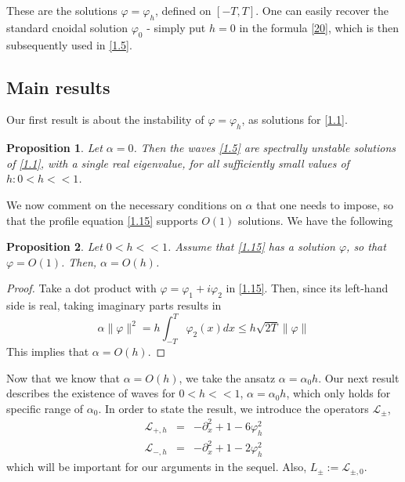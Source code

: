 \documentclass[12pt]{amsart}
\newtheorem{proposition}{Proposition}
\theoremstyle{definition}
\theoremstyle{remark}
\numberwithin{equation}{section}
\renewcommand{\(}{\left(}
\renewcommand{\)}{\right)}
\renewcommand{\[}{\left[}
\renewcommand{\]}{\right]}
\newcommand{\cl}{{\mathcal L}}
\newcommand{\al}{\alpha}
\newcommand{\vp}{\varphi}
\begin{document}
  These are the solutions $\vp=\vp_h$, defined on $[-T,T]$. One can easily recover the standard cnoidal solution $\vp_0$ -  simply put  $h=0$ in the formula \eqref{20}, which is then subsequently used in \eqref{1.5}.
  \subsection{Main results}
  Our first result is about the instability of $\vp=\vp_h$, as solutions for \eqref{1.1}.
  \begin{proposition}
  	\label{prop:10}
  	Let $\al=0$. Then the waves \eqref{1.5} are spectrally unstable solutions of \eqref{1.1}, with a single real eigenvalue,  for all sufficiently small values of $h: 0<h<<1$.
  \end{proposition}
  We now comment on the necessary conditions on $\al$ that   one needs to impose, so that the profile equation \eqref{1.15} supports $O(1)$ solutions. We have the following
  \begin{proposition}
  	\label{prop:90}
  	Let $0<h<<1$. Assume that \eqref{1.15} has a solution $\vp$, so that $\vp=O(1)$. Then, $\al=O(h)$.
  \end{proposition}
  \begin{proof}
  Take a dot product with $\vp=\vp_1+i \vp_2$ in \eqref{1.15}. Then, since its left-hand side is real, taking imaginary parts results in
  $$
  \al \|\vp\|^2 = h \int_{-T}^T  \vp_2(x) dx\leq h \sqrt{2 T} \|\vp\|
  $$
  This implies that $\al=O(h)$.
  \end{proof}

  Now that we know that $\al=O(h)$, we take the ansatz $\al=\al_0 h$.  Our next result describes the existence of waves for $0<h<<1$, $\al=\al_0  h$,  which only holds for  specific range of $\al_0$.  In order to state the result, we introduce the operators $\cl_\pm$,
  \begin{eqnarray*}
  	\cl_{+,h} &=& -\partial_x^2+1-6\varphi_h^2\\
  	\cl_{-,h} &=& -\partial_x^2+1-2\varphi_h^2
  \end{eqnarray*}
  which will be important for our arguments in the sequel. Also, $L_\pm:=\cl_{\pm,0}$.
\end{document}
